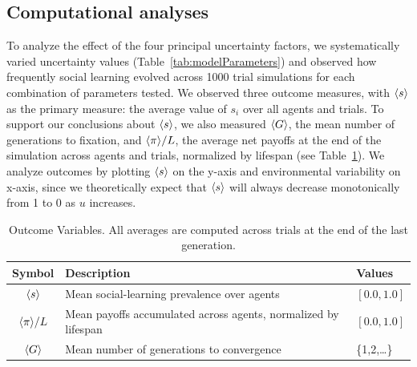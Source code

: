 \documentclass[letterpaper,11.5pt]{scrartcl}
\begin{document}
\subsection{Computational analyses}
\label{ssec:computationalAnalyses}


To analyze the effect of the four principal uncertainty factors, we systematically
varied uncertainty values (Table~\ref{tab:modelParameters}) and observed how frequently social learning evolved across 1000 trial simulations for each combination of parameters tested. %
We observed three outcome measures, with $\langle s \rangle$ as the primary measure: the average value of $s_i$ over all agents and trials. To support our conclusions about $\langle s \rangle$, we also measured $\langle G \rangle$, the mean number of generations to fixation, and $\langle \pi \rangle / L$, the average net  payoffs at the end of the simulation across agents and trials, normalized by lifespan (see Table~\ref{tab:outcomeVariables}). We analyze
outcomes by plotting $\langle s \rangle$ on the y-axis and environmental variability on
x-axis, since we theoretically expect that $\langle s \rangle$ will always decrease monotonically from 1 to 0 as $u$ increases. %

\begin{table}[h]
    \caption{Outcome Variables. All averages are computed across trials at the end of the last generation.}
    \label{tab:outcomeVariables}
    \centering %
    \begin{tabular}{cp{4.25in}p{0.85in}} \toprule

        Symbol & Description & Values \\ 

        \midrule  

        $\langle s \rangle$ & Mean social-learning prevalence over agents
                  & $ [0.0, 1.0]$ \\

        $\langle \pi \rangle / L$ & Mean payoffs accumulated across agents, normalized by
        lifespan & $ [0.0, 1.0]$ \\

        $\langle G \rangle$ & Mean number of generations to convergence & \{1,2,\ldots\} \\
        \bottomrule
    \end{tabular}
\end{table}
\end{document}
